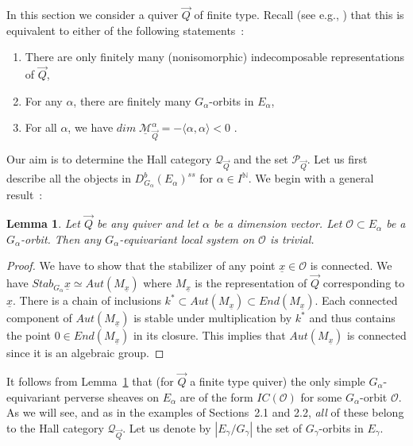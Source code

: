 \documentclass[a4paper,10pt]{amsart}
\def\N{\mathbb{N}}
\def\a{\alpha}
\def\ux{\underline{x}}
\def\Ma{\underline{\mathcal{M}}^{\alpha}_{\vec{Q}}}
\def\QQ{\mathcal{Q}_{\vec{Q}}}
\newtheorem{lem}[theo]{Lemma}
\numberwithin{equation}{section}
\begin{document}
In this section we consider a quiver $\vec{Q}$ of finite type. Recall (see e.g., \cite[Lecture~3]{Trieste} ) that this is equivalent to either of the following statements~:
\begin{enumerate}
\item[a)] There are only finitely many (nonisomorphic) indecomposable representations of $\vec{Q}$,
\item[b)] For any $\a$, there are finitely many $G_{\alpha}$-orbits in $E_{\alpha}$,
\item[c)] For all $\alpha$, we have $dim\;\Ma =-\langle \a, \a \rangle <0$ .
\end{enumerate}

\vspace{.1in}

Our aim is to determine the Hall category $\QQ$ and the set $\mathcal{P}_{\vec{Q}}$. Let us first describe all the objects in $D^b_{G_{\a}}(E_{\a})^{ss}$ for $\a \in I^\N$. We begin with a general result~:

\vspace{.1in}

\begin{lem}\label{L:syst} Let $\vec{Q}$ be any quiver and let $\alpha$ be a dimension vector. Let $\mathcal{O} \subset E_{\a}$ be a $G_{\a}$-orbit. Then any $G_{\a}$-equivariant local system on $\mathcal{O}$ is trivial.
\end{lem}
\begin{proof} We have to show that the stabilizer of any point $\underline{x} \in \mathcal{O}$ is connected. We have $Stab_{G_{\a}}\ux \simeq Aut(M_{\ux})$ where $M_{\ux}$ is the representation of $\vec{Q}$ corresponding to $\ux$. There is a chain of inclusions $k^* \subset Aut(M_{\ux}) \subset End(M_{\ux})$. Each connected component of $Aut(M_{\ux})$ is stable under multiplication by $k^*$ and thus contains the point $0 \in End(M_{\ux})$ in its closure. This implies that $Aut(M_{\ux})$ is connected since it is an algebraic group.
\end{proof}

\vspace{.1in}

It follows from Lemma~\ref{L:syst} that (for $\vec{Q}$ a finite type quiver) the only simple $G_{\a}$-equivariant perverse sheaves on $E_{\a}$ are of the form $IC(\mathcal{O})$ for some $G_{\a}$-orbit $\mathcal{O}$. As we will see, and as in the examples of Sections~2.1 and 2.2, \textit{all} of these belong to the Hall category $\QQ$. Let us denote by $|E_{\gamma}/G_{\gamma}|$ the set of $G_{\gamma}$-orbits in $E_{\gamma}$.
\end{document}
